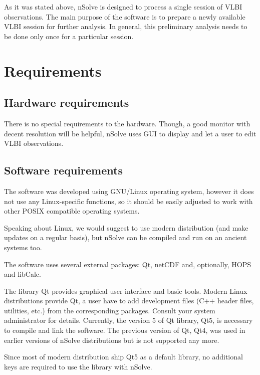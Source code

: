 \documentclass [10pt,letterpaper]{report}
\newcommand{\nuSolve}{\greektext n\latintext Solve}
\begin{document}
As it was stated above, \nuSolve{} is designed to process a single
session of VLBI observations. The main purpose of the software is to
prepare a newly available VLBI session for further analysis. In general,
this preliminary analysis needs to be done only once for a particular
session.





\section{Requirements}
\label{intro_reqs}

\subsection{Hardware requirements}
There is no special requirements to the hardware. Though, a good monitor
with decent resolution will be helpful, \nuSolve{} uses GUI to display
and let a user to edit VLBI observations.


\subsection{Software requirements}
The software was developed using GNU/Linux operating system, however it
does not use any Linux-specific functions, so it should be easily
adjusted to work with other POSIX compatible operating systems.

Speaking about Linux, we would suggest to use modern distribution (and
make updates on a regular basis), but \nuSolve{} can be compiled and run
on an ancient systems too.

The software uses several external packages: Qt, netCDF and, optionally,
HOPS and libCalc.

The library Qt provides graphical user interface and basic tools.
Modern Linux distributions provide Qt, a user have to add development
files (C++ header files, utilities, etc.) from the corresponding
packages. Consult your system administrator for details. Currently,
the version 5 of Qt library, Qt5, is necessary to compile and link
the software. The previous version of Qt, Qt4, was used in earlier
versions of \nuSolve{} distributions but is not supported any more.

Since most of modern distribution ship Qt5 as a default library,
no additional keys are required to use the library with \nuSolve{}.
\end{document}
